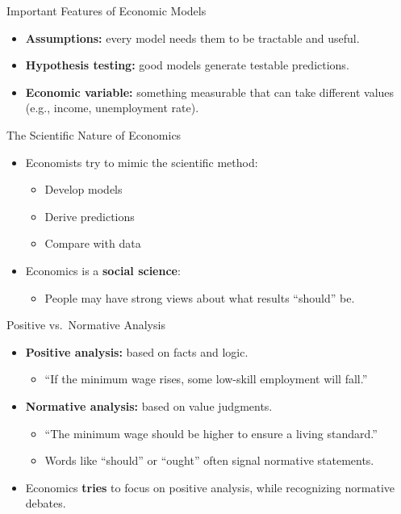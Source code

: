 \documentclass[aspectratio=169]{beamer}
\begin{document}
\begin{frame}{Important Features of Economic Models}
\transfade
\begin{itemize}[<+->]
  \item \textbf{Assumptions:} every model needs them to be tractable and useful.
  \item \textbf{Hypothesis testing:} good models generate testable predictions.
  \item \textbf{Economic variable:} something measurable that can take different values (e.g., income, unemployment rate).
\end{itemize}
\end{frame}

\begin{frame}{The Scientific Nature of Economics}
\transfade
\begin{itemize}[<+->]
  \item Economists try to mimic the scientific method:
  \begin{itemize}[<+->]
    \item Develop models
    \item Derive predictions
    \item Compare with data
  \end{itemize}
  \item Economics is a \textbf{social science}:
  \begin{itemize}[<+->]
    \item People may have strong views about what results ``should'' be.
  \end{itemize}
\end{itemize}
\end{frame}

\begin{frame}{Positive vs.\ Normative Analysis}
\transfade
\begin{itemize}[<+->]
  \item \textbf{Positive analysis:} based on facts and logic.
  \begin{itemize}[<+->]
    \item ``If the minimum wage rises, some low-skill employment will fall.''
  \end{itemize}
  \item \textbf{Normative analysis:} based on value judgments.
  \begin{itemize}[<+->]
    \item ``The minimum wage should be higher to ensure a living standard.''
    \item Words like ``should'' or ``ought'' often signal normative statements.
  \end{itemize}
  \item Economics \textbf{tries} to focus on positive analysis, while recognizing normative debates.
\end{itemize}
\end{frame}
\end{document}
